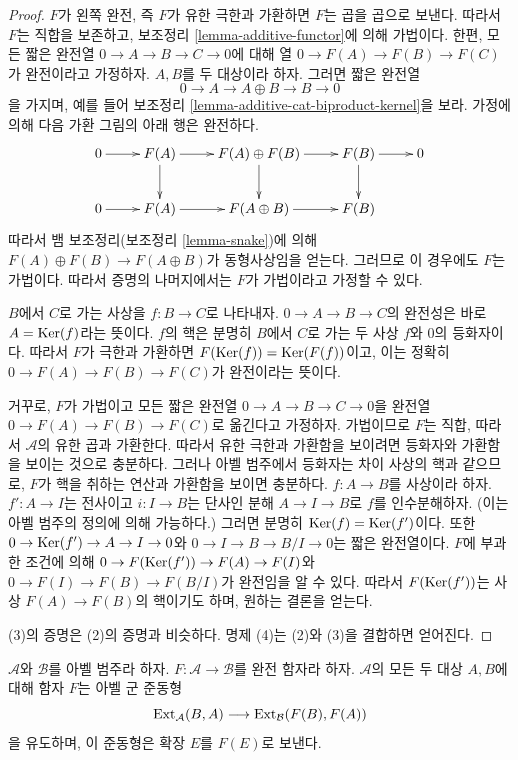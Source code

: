 \begin{proof}
$F$가 왼쪽 완전, 즉 $F$가 유한 극한과 가환하면 $F$는 곱을 곱으로
보낸다. 따라서 $F$는 직합을 보존하고, 보조정리
\ref{lemma-additive-functor}에 의해 가법이다. 한편, 모든 짧은 완전열
$0 \to A \to B \to C \to 0$에 대해 열
$0 \to F(A) \to F(B) \to F(C)$가 완전이라고 가정하자.
$A, B$를 두 대상이라 하자. 그러면 짧은 완전열
$$
0 \to A \to A \oplus B \to B \to 0
$$
을 가지며, 예를 들어 보조정리
\ref{lemma-additive-cat-biproduct-kernel}을 보라. 가정에 의해 다음
가환 그림의 아래 행은 완전하다.
$$
\xymatrix{
0 \ar[r] &
F(A) \ar[d] \ar[r] &
F(A) \oplus F(B) \ar[r] \ar[d] &
F(B) \ar[d] \ar[r] &
0 \\
0 \ar[r] &
F(A) \ar[r] &
F(A \oplus B) \ar[r] &
F(B)
}
$$
따라서 뱀 보조정리(보조정리 \ref{lemma-snake})에 의해
$F(A) \oplus F(B) \to F(A \oplus B)$가 동형사상임을 얻는다.
그러므로 이 경우에도 $F$는 가법이다. 따라서 증명의 나머지에서는
$F$가 가법이라고 가정할 수 있다.

\medskip\noindent
$B$에서 $C$로 가는 사상을 $f : B \to C$로 나타내자.
$0 \to A \to B \to C$의 완전성은 바로 $A = \mathop{\mathrm{Ker}}(f)$라는 뜻이다.
$f$의 핵은 분명히 $B$에서 $C$로 가는 두 사상 $f$와 $0$의
등화자이다. 따라서 $F$가 극한과 가환하면
$F(\mathop{\mathrm{Ker}}(f)) = \mathop{\mathrm{Ker}}(F(f))$이고, 이는 정확히
$0 \to F(A) \to F(B) \to F(C)$가 완전이라는 뜻이다.

\medskip\noindent
거꾸로, $F$가 가법이고 모든 짧은 완전열
$0 \to A \to B \to C \to 0$을 완전열
$0 \to F(A) \to F(B) \to F(C)$로 옮긴다고 가정하자.
가법이므로 $F$는 직합, 따라서 $\mathcal{A}$의 유한 곱과 가환한다.
따라서 유한 극한과 가환함을 보이려면 등화자와 가환함을 보이는 것으로
충분하다. 그러나 아벨 범주에서 등화자는 차이 사상의 핵과 같으므로,
$F$가 핵을 취하는 연산과 가환함을 보이면 충분하다.
$f : A \to B$를 사상이라 하자. $f' : A \to I$는 전사이고
$i : I \to B$는 단사인 분해 $A \to I \to B$로 $f$를 인수분해하자.
(이는 아벨 범주의 정의에 의해 가능하다.) 그러면 분명히
$\mathop{\mathrm{Ker}}(f) = \mathop{\mathrm{Ker}}(f')$이다. 또한
$0 \to \mathop{\mathrm{Ker}}(f') \to A \to I \to 0$와
$0 \to I \to B \to B/I \to 0$는 짧은 완전열이다.
$F$에 부과한 조건에 의해
$0 \to F(\mathop{\mathrm{Ker}}(f')) \to F(A) \to F(I)$와
$0 \to F(I) \to F(B) \to F(B/I)$가 완전임을 알 수 있다.
따라서 $F(\mathop{\mathrm{Ker}}(f'))$는 사상 $F(A) \to F(B)$의 핵이기도 하며,
원하는 결론을 얻는다.

\medskip\noindent
(3)의 증명은 (2)의 증명과 비슷하다. 명제 (4)는 (2)와 (3)을
결합하면 얻어진다.
\end{proof}

\begin{lemma}
\label{lemma-exact-functor-ext}
$\mathcal{A}$와 $\mathcal{B}$를 아벨 범주라 하자.
$F : \mathcal{A} \to \mathcal{B}$를 완전 함자라 하자.
$\mathcal{A}$의 모든 두 대상 $A, B$에 대해 함자 $F$는 아벨 군
준동형
$$
\mathop{\mathrm{Ext}}\nolimits_\mathcal{A}(B, A)
\longrightarrow
\mathop{\mathrm{Ext}}\nolimits_\mathcal{B}(F(B), F(A))
$$
을 유도하며, 이 준동형은 확장 $E$를 $F(E)$로 보낸다.
\end{lemma}

